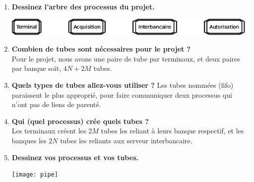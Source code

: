 \documentclass[french, a4paper, 12pt, titlepage]{article}
\begin{document}
\begin{enumerate}
\item \textbf{Dessinez l'arbre des processus du projet.}
\smallskip
\begin{center}
\includegraphics[scale=0.3]{fork}
\end{center}

\item \textbf{Combien de tubes sont nécessaires pour le projet ?}\\
Pour le projet, nous avons une paire de tube par terminaux, et deux paires par banque soit, $4N+2M$ tubes.\\

\item \textbf{Quels types de tubes allez-vous utiliser ?}
Les tubes nommées (fifo) paraissent le plus approprié, pour faire communiquer deux processus qui n'ont pas de liens de parenté.\\

\item \textbf{Qui (quel processus) crée quels tubes ?}\\
Les terminaux créent les $2M$ tubes les reliant à leurs banque respectif, et les banques les $2N$ tubes les reliants aux serveur interbancaire.\\

\pagebreak
\item \textbf{Dessinez vos processus et vos tubes.}\\
\begin{center}
\texttt{[image: pipe]}
\end{center}

\end{enumerate}
\end{document}
